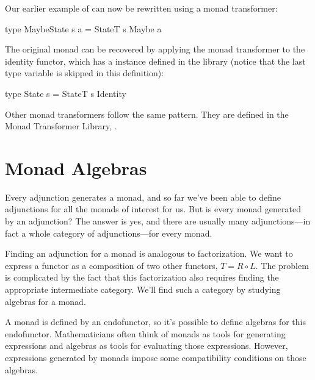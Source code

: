 \documentclass[DaoFP]{subfiles}
\begin{document}
Our earlier example of  can now be rewritten using a monad transformer:
\begin{haskell}
type MaybeState s a = StateT s Maybe a
\end{haskell}

The original  monad can be recovered by applying the  monad transformer to the identity functor, which has a  instance defined in the library (notice that the last type variable  is skipped in this definition):
\begin{haskell}
type State s = StateT s Identity
\end{haskell}

Other monad transformers follow the same pattern. They are defined in the Monad Transformer Library, .

\section{Monad Algebras}

Every adjunction generates a monad, and so far we've been able to define adjunctions for all the monads of interest for us. But is every monad generated by an adjunction? The answer is yes, and there are usually many adjunctions---in fact a whole category of adjunctions---for every monad.

Finding an adjunction for a monad is analogous to factorization. We want to express a functor as a composition of two other functors, $T = R \circ L$. The problem is complicated by the fact that this factorization also requires finding the appropriate intermediate category. We'll find such a category by studying algebras for a monad.

A monad is defined by an endofunctor, so it's possible to define algebras for this endofunctor. Mathematicians often think of monads as tools for generating expressions and algebras as tools for evaluating those expressions. However, expressions generated by monads impose some compatibility conditions on those algebras. 
\end{document}
